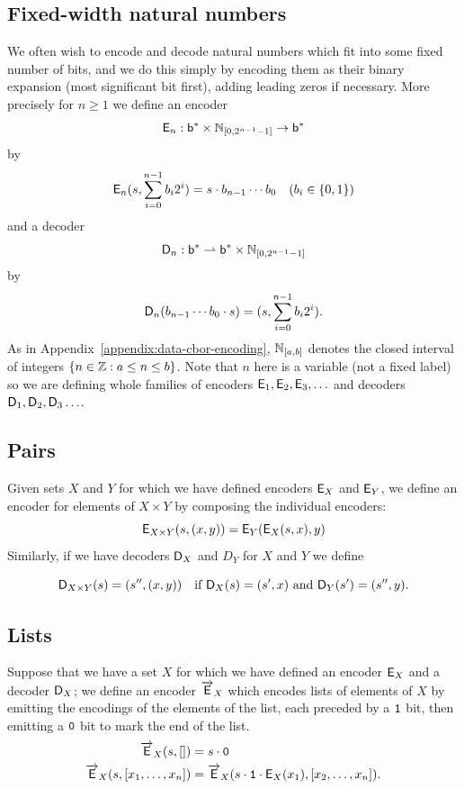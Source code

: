 \subsection{Fixed-width natural numbers}
We often wish to encode and decode natural numbers which fit into some fixed
number of bits, and we do this simply by encoding them as their binary expansion
(most significant bit first), adding leading zeros if necessary.  More precisely
for $n \geq 1$ we define an encoder
$$
\mathsf{E}_n : \mathsf{b}^* \times \mathbb{N}_{[0,2^{n-1}-1]} \rightarrow \mathsf{b}^*
$$
by
$$
\mathsf{E}_n(s, \sum^{n-1}_{i=0}b_i2^i) = s \cdot b_{n-1} \cdots b_0 \quad \text{($b_i \in \{0,1\}$)}
$$
and a decoder
$$
\mathsf{D}_n : \mathsf{b}^* \rightharpoonup \mathsf{b}^* \times \mathbb{N}_{[0,2^{n-1}-1]}
$$
by
$$
\mathsf{D}_n(b_{n-1}\cdots{b_0} \cdot s)= (s,\sum^{n-1}_{i=0}b_i2^i).
$$ As in Appendix~\ref{appendix:data-cbor-encoding}, $\mathbb{N}_{[a,b]}$ denotes the
closed interval of integers $\{n \in \mathbb{Z} : a \leq n \leq b\}$.  Note that $n$
here is a variable (not a fixed label) so we are defining whole families of
encoders $\mathsf{E}_1, \mathsf{E}_2, \mathsf{E}_3, \ldots$ and decoders $\mathsf{D}_1, \mathsf{D}_2, \mathsf{D}_3\ldots$.

\subsection{Pairs}
\label{sec:flat:pairs}
Given sets $X$ and $Y$ for which we have defined encoders $\mathsf{E}_X$ and $\mathsf{E}_Y$, we
define an encoder for elements of $X \times Y$ by composing the individual encoders:
$$
\mathsf{E}_{X \times Y} (s, (x,y)) = \mathsf{E}_Y(\mathsf{E}_X(s,x), y)
$$
Similarly, if we have decoders $\mathsf{D}_X$ and $D_Y$ for $X$ and $Y$ we define

$$
\mathsf{D}_{X \times Y} (s) = (s'', (x,y)) \quad \text{if $\mathsf{D}_X(s) = (s', x)$ and $\mathsf{D}_Y(s') = (s'', y)$}.
$$


\subsection{Lists}
\label{sec:flat:lists}
Suppose that we have a set $X$ for which we have defined an encoder $\mathsf{E}_X$ and a
decoder $\mathsf{D}_X$; we define an encoder $\overrightarrow{\mathsf{E}}_X$ which encodes lists of elements
of $X$ by emitting the encodings of the elements of the list, each preceded by a
$\mathtt{1}$ bit, then emitting a $\mathtt{0}$ bit to mark the end of the list.
\begin{align*}
  \overrightarrow{\mathsf{E}}_X(s,[]) &= s \cdot \mathtt{0} \\
  \overrightarrow{\mathsf{E}}_X(s,[x_1, \ldots, x_n]) &= \overrightarrow{\mathsf{E}}_X (s \cdot \mathtt{1} \cdot \mathsf{E}_X(x_1), [x_2, \ldots, x_n]).
\end{align*}


